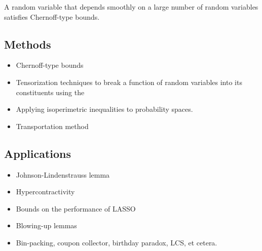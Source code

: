 \begin{theorem} \label{thm:tal}
    A random variable that depends smoothly on a large number of random
    variables satisfies Chernoff-type bounds.
\end{theorem}

\subsection*{Methods}
\begin{itemize}
    \item Chernoff-type bounds
    \item Tensorization techniques to break a function of
    random variables into its constituents using the
    \item Applying isoperimetric inequalities to probability spaces.
    \item Transportation method
\end{itemize}

\subsection*{Applications}
\begin{itemize}
    \item Johnson-Lindenstrauss lemma
    \item Hypercontractivity
    \item Bounds on the performance of LASSO
    \item Blowing-up lemmas
    \item Bin-packing, coupon collector, birthday paradox, LCS, et cetera.
\end{itemize}
